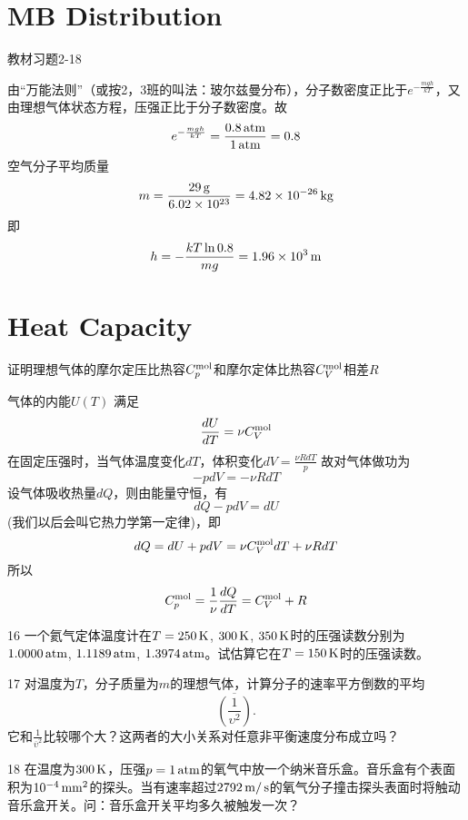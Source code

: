 \documentclass[CJK]{beamer}
\begin{document}
\section{MB Distribution}

\begin{frame}
\bch
{\blue 教材习题2-18}

\skipline

{\scriptsize
由“万能法则”（或按2，3班的叫法：玻尔兹曼分布），分子数密度正比于$e^{-\frac{mgh}{kT}}$，又由理想气体状态方程，压强正比于分子数密度。故
$$ e^{-\frac{mgh}{kT}} = \frac{0.8\,\mathrm{atm}}{1\,\mathrm{atm}} = 0.8$$
空气分子平均质量
$$m = \frac{29\,\mathrm{g}}{6.02\times 10^{23}} = 4.82\times 10^{-26}\,\mathrm{kg}$$
即
$$h = -\frac{kT\ln 0.8}{mg} = 1.96\times 10^3 \,\mathrm{m}$$ 
}
\ech
\end{frame}

\section{Heat Capacity}


\begin{frame}
\bch
{\blue 证明理想气体的摩尔定压比热容$C_p^{\rm mol}$和摩尔定体比热容$C_V^{\rm mol}$相差$R$}

\skipline
{\scriptsize
气体的内能$U(T)$ 满足
$$\frac{dU}{dT} = \nu C_V^{\rm mol}$$
在固定压强时，当气体温度变化$dT$，体积变化$dV = \frac{ \nu R dT}{p}$
故对气体做功为
$$-p dV = - \nu R dT$$
设气体吸收热量$dQ$，则由能量守恒，有
$$dQ - pdV = dU$$
(我们以后会叫它热力学第一定律)，即
$$dQ = dU + pdV =  \nu C_V^{\rm mol}dT + \nu RdT$$
所以
$$C_p^{\rm mol} = \frac{1}{\nu} \frac{dQ}{dT} = C_V^{\rm mol} + R$$

}
\ech
\end{frame}

\begin{frame}
\bch
\bitem
\item[16]{一个氦气定体温度计在$T = 250\,\mathrm{K}$, $300\,\mathrm{K}$, $350\,\mathrm{K}$时的压强读数分别为$1.0000\,\mathrm{atm}$, $1.1189\,\mathrm{atm}$, $1.3974\,\mathrm{atm}$。试估算它在$T=150\,\mathrm{K}$时的压强读数。}
\item[17]{对温度为$T$，分子质量为$m$的理想气体，计算分子的速率平方倒数的平均$$\overline{\left(\frac{1}{\upsilon^2}\right)}.$$它和$\frac{1}{\overline{\upsilon}^2}$比较哪个大？这两者的大小关系对任意非平衡速度分布成立吗？}
\item[18]{在温度为$300\,\mathrm{K}$，压强$p = 1\,\mathrm{atm}$的氧气中放一个纳米音乐盒。音乐盒有个表面积为$10^{-4}\,\mathrm{mm}^2$的探头。当有速率超过$2792\,\mathrm{m}/\,\mathrm{s}$的氧气分子撞击探头表面时将触动音乐盒开关。问：音乐盒开关平均多久被触发一次？}
\eitem
\ech
\end{frame}
\end{document}
